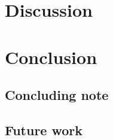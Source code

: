 \documentclass{article}
\begin{document}
\section{Discussion}\label{section:discussion}
\section{Conclusion}\label{section:conclusion}
\subsection{Concluding note}
\subsection{Future work}




\begin{appendices}

\end{appendices}
\clearpage

\glsaddall
\printnoidxglossary
\end{document}
